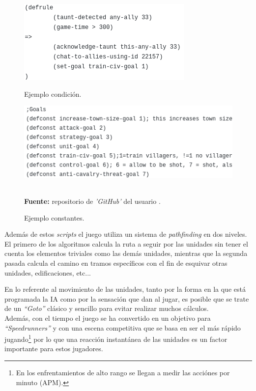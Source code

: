 \begin{figure}[ht]
\centering
\begin{minipage}[c]{0.45\linewidth}
	\hspace{9mm}
	\includegraphics[height=0.11\textheight]{imagenes/marco_teo/referentes/aoe_scripting_3.png}
	\caption{Ejemplo condición.}
	\label{img:aoe_script_3}
\end{minipage}
\begin{minipage}[c]{0.45\linewidth}
	\hspace{2mm}
	\includegraphics[height=0.11\textheight]{imagenes/marco_teo/referentes/aoe_scripting_4.png}
	\caption{Ejemplo constantes.}
	\label{img:aoe_script_4}
\end{minipage}\\[3mm]
\textbf{Fuente:} repositorio de \textit{'GitHub'} del usuario \citeauthor*{Andygmb2014}. 
\end{figure}

Además de estos \textit{scripts} el juego utiliza un sistema de \textit{pathfinding} en dos niveles.
El primero de los algoritmos calcula la ruta a seguir por las unidades sin tener el cuenta los
elementos triviales como las demás unidades, mientras que la segunda pasada calcula el camino 
en tramos específicos con el fin de esquivar otras unidades, edificaciones, etc...

En lo referente al movimiento de las unidades, tanto por la forma en la que está programada
la \ac{IA} como por la sensación que dan al jugar, es posible que se trate de un  \textit{``Goto''}
clásico y sencillo para evitar realizar muchos cálculos. \\
Además, con el tiempo el juego se ha convertido en un objetivo para \textit{``Speedrunners''}
y con una escena competitiva que se basa en ser el más rápido jugando\footnote{En los enfrentamientos de alto rango se llegan a medir las acciónes por minuto (APM).}
por lo que una reacción instantánea de las unidades es un factor importante para  estos
jugadores.

